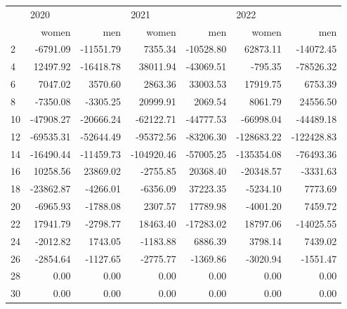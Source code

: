 \begin{tabular}{lrrrrrr}
\toprule
{} & \multicolumn{2}{l}{2020} & \multicolumn{2}{l}{2021} & \multicolumn{2}{l}{2022} \\
{} &     women &       men &      women &       men &      women &        men \\
\midrule
2  &  -6791.09 & -11551.79 &    7355.34 & -10528.80 &   62873.11 &  -14072.45 \\
4  &  12497.92 & -16418.78 &   38011.94 & -43069.51 &    -795.35 &  -78526.32 \\
6  &   7047.02 &   3570.60 &    2863.36 &  33003.53 &   17919.75 &    6753.39 \\
8  &  -7350.08 &  -3305.25 &   20999.91 &   2069.54 &    8061.79 &   24556.50 \\
10 & -47908.27 & -20666.24 &  -62122.71 & -44777.53 &  -66998.04 &  -44489.18 \\
12 & -69535.31 & -52644.49 &  -95372.56 & -83206.30 & -128683.22 & -122428.83 \\
14 & -16490.44 & -11459.73 & -104920.46 & -57005.25 & -135354.08 &  -76493.36 \\
16 &  10258.56 &  23869.02 &   -2755.85 &  20368.40 &  -20348.57 &   -3331.63 \\
18 & -23862.87 &  -4266.01 &   -6356.09 &  37223.35 &   -5234.10 &    7773.69 \\
20 &  -6965.93 &  -1788.08 &    2307.57 &  17789.98 &   -4001.20 &    7459.72 \\
22 &  17941.79 &  -2798.77 &   18463.40 & -17283.02 &   18797.06 &  -14025.55 \\
24 &  -2012.82 &   1743.05 &   -1183.88 &   6886.39 &    3798.14 &    7439.02 \\
26 &  -2854.64 &  -1127.65 &   -2775.77 &  -1369.86 &   -3020.94 &   -1551.47 \\
28 &      0.00 &      0.00 &       0.00 &      0.00 &       0.00 &       0.00 \\
30 &      0.00 &      0.00 &       0.00 &      0.00 &       0.00 &       0.00 \\
\bottomrule
\end{tabular}

